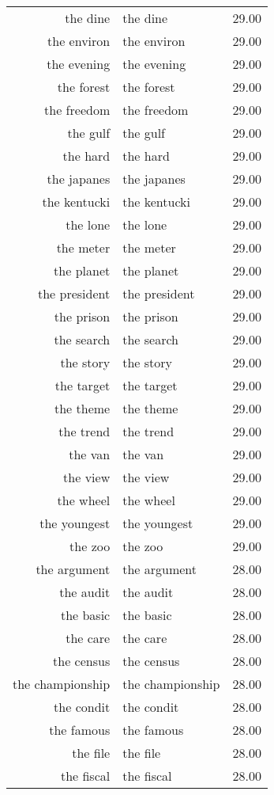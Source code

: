 \begin{table}[ht]
\begin{tabular}{rlr}
  the dine & the dine & 29.00 \\ 
  the environ & the environ & 29.00 \\ 
  the evening & the evening & 29.00 \\ 
  the forest & the forest & 29.00 \\ 
  the freedom & the freedom & 29.00 \\ 
  the gulf & the gulf & 29.00 \\ 
  the hard & the hard & 29.00 \\ 
  the japanes & the japanes & 29.00 \\ 
  the kentucki & the kentucki & 29.00 \\ 
  the lone & the lone & 29.00 \\ 
  the meter & the meter & 29.00 \\ 
  the planet & the planet & 29.00 \\ 
  the president & the president & 29.00 \\ 
  the prison & the prison & 29.00 \\ 
  the search & the search & 29.00 \\ 
  the story & the story & 29.00 \\ 
  the target & the target & 29.00 \\ 
  the theme & the theme & 29.00 \\ 
  the trend & the trend & 29.00 \\ 
  the van & the van & 29.00 \\ 
  the view & the view & 29.00 \\ 
  the wheel & the wheel & 29.00 \\ 
  the youngest & the youngest & 29.00 \\ 
  the zoo & the zoo & 29.00 \\ 
  the argument & the argument & 28.00 \\ 
  the audit & the audit & 28.00 \\ 
  the basic & the basic & 28.00 \\ 
  the care & the care & 28.00 \\ 
  the census & the census & 28.00 \\ 
  the championship & the championship & 28.00 \\ 
  the condit & the condit & 28.00 \\ 
  the famous & the famous & 28.00 \\ 
  the file & the file & 28.00 \\ 
  the fiscal & the fiscal & 28.00 \\ 

\end{tabular}
\end{table}

